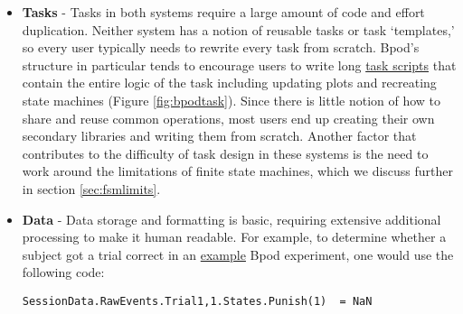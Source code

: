\begin{itemize}[resume*, before=\vspace{0pt}, after=\vspace{\baselineskip}]%
    \item \textbf{Tasks} - Tasks in both systems require a large amount of code and effort duplication. Neither system has a notion of reusable tasks or task `templates,' so every user typically needs to rewrite every task from scratch. Bpod's structure in particular tends to encourage users to write long \href{https://github.com/sanworks/Bpod_Gen2/blob/df6cd0c7d5df8247b02077b05fc263f79b86b096/Examples/Protocols/Sound/AnalogSound2AFC/AnalogSound2AFC.m}{task scripts} that contain the entire logic of the task including updating plots and recreating state machines (Figure \ref{fig:bpodtask}). Since there is little notion of how to share and reuse common operations, most users end up creating their own secondary libraries and writing them from scratch. Another factor that contributes to the difficulty of task design in these systems is the need to work around the limitations of finite state machines, which we discuss further in section \ref{sec:fsmlimits}.
    \item \textbf{Data} - Data storage and formatting is basic, requiring extensive additional processing to make it human readable. For example, to determine whether a subject got a trial correct in an \href{https://github.com/sanworks/Bpod_Gen2/blob/master/Examples/Protocols/Light/Light2AFC/Light2AFC.m}{example} Bpod experiment, one would use the following code:
    
    \texttt{SessionData.RawEvents.Trial{1,1}.States.Punish(1) ~= NaN}
    

\end{itemize}
